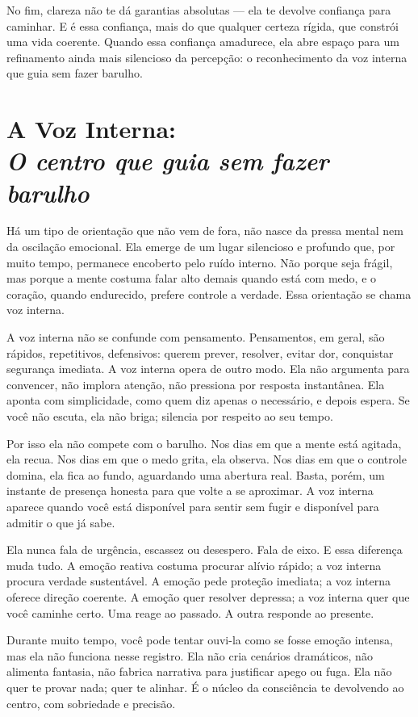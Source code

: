 \documentclass[12pt]{book}
\begin{document}
No fim, clareza não te dá garantias absolutas — ela te devolve confiança para caminhar. E é essa confiança, mais do que qualquer certeza rígida, que constrói uma vida coerente. Quando essa confiança amadurece, ela abre espaço para um refinamento ainda mais silencioso da percepção: o reconhecimento da voz interna que guia sem fazer barulho.

\chapter[A Voz Interna: O centro que guia sem fazer barulho]{A Voz Interna:\\[0.4ex]\large\itshape O centro que guia sem fazer barulho}

Há um tipo de orientação que não vem de fora, não nasce da pressa mental nem da oscilação emocional. Ela emerge de um lugar silencioso e profundo que, por muito tempo, permanece encoberto pelo ruído interno. Não porque seja frágil, mas porque a mente costuma falar alto demais quando está com medo, e o coração, quando endurecido, prefere controle a verdade. Essa orientação se chama voz interna.

A voz interna não se confunde com pensamento. Pensamentos, em geral, são rápidos, repetitivos, defensivos: querem prever, resolver, evitar dor, conquistar segurança imediata. A voz interna opera de outro modo. Ela não argumenta para convencer, não implora atenção, não pressiona por resposta instantânea. Ela aponta com simplicidade, como quem diz apenas o necessário, e depois espera. Se você não escuta, ela não briga; silencia por respeito ao seu tempo.

Por isso ela não compete com o barulho. Nos dias em que a mente está agitada, ela recua. Nos dias em que o medo grita, ela observa. Nos dias em que o controle domina, ela fica ao fundo, aguardando uma abertura real. Basta, porém, um instante de presença honesta para que volte a se aproximar. A voz interna aparece quando você está disponível para sentir sem fugir e disponível para admitir o que já sabe.

Ela nunca fala de urgência, escassez ou desespero. Fala de eixo. E essa diferença muda tudo. A emoção reativa costuma procurar alívio rápido; a voz interna procura verdade sustentável. A emoção pede proteção imediata; a voz interna oferece direção coerente. A emoção quer resolver depressa; a voz interna quer que você caminhe certo. Uma reage ao passado. A outra responde ao presente.

Durante muito tempo, você pode tentar ouvi-la como se fosse emoção intensa, mas ela não funciona nesse registro. Ela não cria cenários dramáticos, não alimenta fantasia, não fabrica narrativa para justificar apego ou fuga. Ela não quer te provar nada; quer te alinhar. É o núcleo da consciência te devolvendo ao centro, com sobriedade e precisão.
\end{document}
